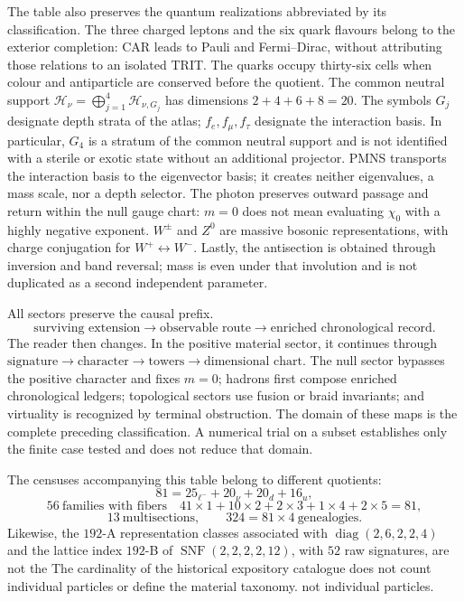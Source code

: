 
The table also preserves the quantum realizations abbreviated by its
classification. The three charged leptons and the six quark flavours belong to the
exterior completion: CAR leads to Pauli and Fermi--Dirac, without attributing those
relations to an isolated TRIT. The quarks occupy thirty-six cells when
colour and antiparticle are conserved before the quotient. The common neutral support
\(\mathcal H_\nu=\bigoplus_{j=1}^{4}\mathcal H_{\nu,G_j}\) has dimensions
\(2+4+6+8=20\). The symbols \(G_j\) designate depth strata of the atlas;
\(f_e,f_\mu,f_\tau\) designate the interaction basis. In particular, \(G_4\) is
a stratum of the common neutral support and is not identified with a sterile or
exotic state without an additional projector. PMNS transports the interaction basis to the
eigenvector basis; it creates neither eigenvalues, a mass scale, nor a
depth selector. The photon preserves outward passage and return within the
null gauge chart: \(m=0\) does not mean evaluating \(\chi_0\) with a highly
negative exponent. \(W^\pm\) and \(Z^0\) are massive bosonic representations, with
charge conjugation for \(W^+\leftrightarrow W^-\). Lastly, the
antisection is obtained through inversion and band reversal; mass is even
under that involution and is not duplicated as a second independent parameter.

All sectors preserve the causal prefix.
\[
\text{surviving extension}\longrightarrow\text{observable route}
\longrightarrow\text{enriched chronological record}.
\]
The reader then changes. In the positive material sector, it continues through
\(\text{signature}\to\text{character}\to\text{towers}\to\text{dimensional chart}\).
The null sector bypasses the positive character and fixes \(m=0\); hadrons first compose
enriched chronological ledgers; topological sectors use fusion or
braid invariants; and virtuality is recognized by terminal obstruction. The
domain of these maps is the complete preceding classification. A
numerical trial on a subset establishes only the finite case tested and does not
reduce that domain.

The censuses accompanying this table belong to different quotients:
\[
81=25_{\ell^-}+20_\nu+20_d+16_u,
\]
\[
56\ \text{families with fibers}\quad
41\times1+10\times2+2\times3+1\times4+2\times5=81,
\]
\[
13\ \text{multisections},\qquad324=81\times4\ \text{genealogies}.
\]
Likewise, the \(192\)-A representation classes associated with
\(\operatorname{diag}(2,6,2,2,4)\) and the lattice index \(192\)-B of
\(\operatorname{SNF}(2,2,2,2,12)\), with \(52\) raw signatures, are not the
The cardinality of the historical expository catalogue does not count individual particles or define the material taxonomy.
not individual particles.
